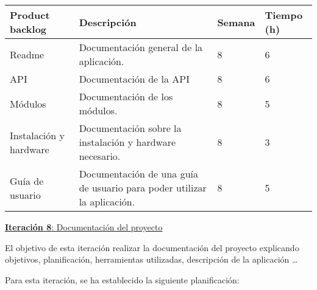 \begin{table}[h!]
\begin{tabular}{|p{4cm}|p{7.2cm}|p{1.3cm}|p{2.1cm}|}
\hline
\rowcolor[HTML]{9B9B9B} 
{\color[HTML]{FFFFFF} Product backlog} & {\color[HTML]{FFFFFF} Descripción}                                  & {\color[HTML]{FFFFFF} Semana} & {\color[HTML]{FFFFFF}Tiempo (h)} \\ \hline

Readme                          & Documentación general de la aplicación.
                                        & 8                            & 6                                   \\ \hline
          
API                         &  Documentación de la API
          & 8                             & 6                                   \\ \hline

Módulos & Documentación de los módulos.

          & 8                             & 5                                   \\ \hline

Instalación y hardware                        & Documentación sobre la instalación y hardware necesario.
          & 8                             & 3                                  \\ \hline
        
Guía de usuario                        & Documentación de una guía de usuario para poder utilizar la aplicación.
          & 8                             & 5                                  \\ \hline

\end{tabular}
\end{table}

\newpage


\large{\underline{\textbf{Iteración 8}: Documentación del proyecto}}
\vspace{0.3cm}

\normalsize

El objetivo de esta iteración realizar la documentación del proyecto explicando objetivos, planificación, herramientas utilizadas, descripción de la aplicación \ldots

Para esta iteración, se ha establecido la siguiente planificación:

